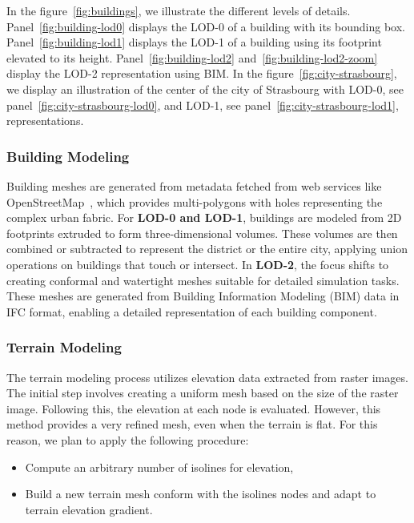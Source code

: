 \documentclass[runningheads]{llncs}
\begin{document}
In the figure~\ref{fig:buildings}, we illustrate the different levels of details. Panel~\ref{fig:building-lod0} displays the LOD-0 of a building with its bounding box.
Panel~\ref{fig:building-lod1} displays the LOD-1 of a building using its footprint elevated to its height. 
Panel~\ref{fig:building-lod2} and~\ref{fig:building-lod2-zoom} display the LOD-2 representation using BIM. In the figure~\ref{fig:city-strasbourg}, we display an illustration of the center of the city of Strasbourg with LOD-0, see panel~\ref{fig:city-strasbourg-lod0}, and LOD-1, see panel~\ref{fig:city-strasbourg-lod1}, representations.



\subsubsection{Building Modeling}
Building meshes are generated from metadata fetched from web services like OpenStreetMap~\cite{openstreetmap_contributors_planet_2017}, which provides multi-polygons with holes representing the complex urban fabric. For \textbf{LOD-0 and LOD-1}, buildings are modeled from 2D footprints extruded to form three-dimensional volumes. These volumes are then combined or subtracted to represent the district or the entire city, applying union operations on buildings that touch or intersect. In \textbf{LOD-2}, the focus shifts to creating conformal and watertight meshes suitable for detailed simulation tasks. These meshes are generated from Building Information Modeling (BIM) data in IFC format, enabling a detailed representation of each building component.



\subsubsection{Terrain Modeling}
The terrain modeling process utilizes elevation data extracted from raster images. The initial step involves creating a uniform mesh based on the size of the raster image. Following this, the elevation at each node is evaluated.
However, this method provides a very refined mesh, even when the terrain is flat. For this reason, we plan to apply the following procedure:
\begin{itemize}
    \item Compute an arbitrary number of isolines for elevation,
    \item Build a new terrain mesh conform with the isolines nodes and adapt to terrain elevation gradient.
\end{itemize}
\end{document}
